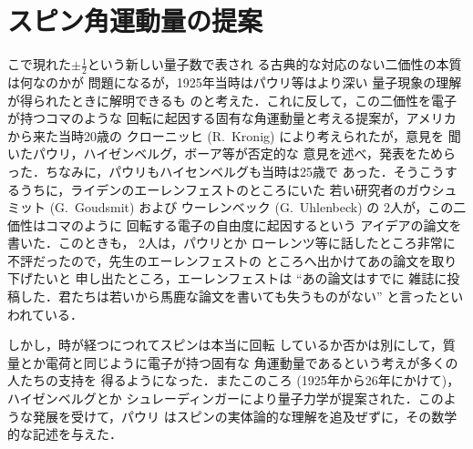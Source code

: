 \documentclass{jsarticle}
\begin{document}
\section{スピン角運動量の提案}
\label{sec:angularmomentum}

こで現れた$\pm\frac{1}{2}$という新しい量子数で表され
る古典的な対応のない二価性の本質は何なのかが
問題になるが，1925年当時はパウリ等はより深い
量子現象の理解が得られたときに解明できるも
のと考えた．これに反して，この二価性を電子が持つコマのような
回転に起因する固有な角運動量と考える提案が，アメリカから来た当時20歳の
クローニッヒ (R.\ Kronig) により考えられたが，意見を
聞いたパウリ，ハイゼンベルグ，ボーア等が否定的な
意見を述べ，発表をためらった．ちなみに，パウリもハイセンベルグも当時は25歳で
あった．そうこうするうちに，ライデンのエーレンフェストのところにいた
若い研究者のガウシュミット (G.\ Goudsmit) および
ウーレンベック (G.\ Uhlenbeck) の 2人が，この二価性はコマのように
回転する電子の自由度に起因するという
アイデアの論文を書いた．このときも， 2人は，パウリとか
ローレンツ等に話したところ非常に不評だったので，先生のエーレンフェストの
ところへ出かけてあの論文を取り下げたいと
申し出たところ，エーレンフェストは ``あの論文はすでに
雑誌に投稿した．君たちは若いから馬鹿な論文を書いても失うものがない'' 
と言ったといわれている．

しかし，時が経つにつれてスピンは本当に回転
しているか否かは別にして，質量とか電荷と同じように電子が持つ固有な
角運動量であるという考えが多くの人たちの支持を
得るようになった．またこのころ (1925年から26年にかけて)，ハイゼンベルグとか
シュレーディンガーにより量子力学が提案された．このような発展を受けて，パウリ
はスピンの実体論的な理解を追及ぜずに，その数学的な記述を与えた．
\end{document}
